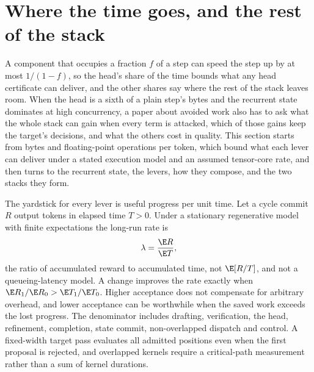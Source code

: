 \section{Where the time goes, and the rest of the stack}\label{sec:stack}\label{sec:time}
A component that occupies a fraction $f$ of a step can speed the step up by at most $1/(1-f)$, so the head's share of the time bounds what any head certificate can deliver, and the other shares say where the rest of the stack leaves room. When the head is a sixth of a plain step's bytes and the recurrent state dominates at high concurrency, a paper about avoided work also has to ask what the whole stack can gain when every term is attacked, which of those gains keep the target's decisions, and what the others cost in quality. This section starts from bytes and floating-point operations per token, which bound what each lever can deliver under a stated execution model and an assumed tensor-core rate, and then turns to the recurrent state, the levers, how they compose, and the two stacks they form.

The yardstick for every lever is useful progress per unit time.\label{sec:rate} Let a cycle commit $R$ output tokens in elapsed time $T>0$. Under a stationary regenerative model with finite expectations the long-run rate is
\begin{equation}\lambda=\frac{\E R}{\E T},\label{eq:rate}\end{equation}
the ratio of accumulated reward to accumulated time, not $\E[R/T]$, and not a queueing-latency model. A change improves the rate exactly when $\E R_1/\E R_0>\E T_1/\E T_0$. Higher acceptance does not compensate for arbitrary overhead, and lower acceptance can be worthwhile when the saved work exceeds the lost progress. The denominator includes drafting, verification, the head, refinement, completion, state commit, non-overlapped dispatch and control. A fixed-width target pass evaluates all admitted positions even when the first proposal is rejected, and overlapped kernels require a critical-path measurement rather than a sum of kernel durations.

